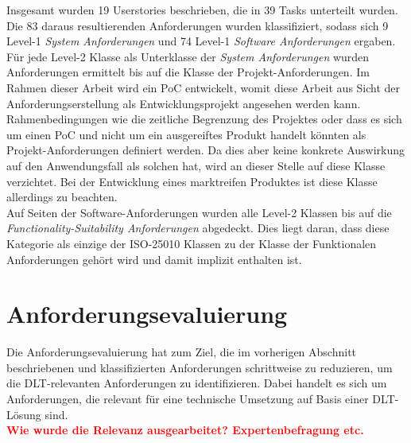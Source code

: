 Insgesamt wurden 19 Userstories beschrieben, die in 39 Tasks unterteilt wurden. Die 83 daraus resultierenden Anforderungen wurden klassifiziert, sodass sich 9 Level-1 \textit{System Anforderungen} und 74 Level-1 \textit{Software Anforderungen} ergaben. Für jede Level-2 Klasse als Unterklasse der \textit{System Anforderungen} wurden Anforderungen ermittelt bis auf die Klasse der Projekt-Anforderungen. Im Rahmen dieser Arbeit wird ein \ac{PoC} entwickelt, womit diese Arbeit aus Sicht der Anforderungserstellung als Entwicklungsprojekt angesehen werden kann. Rahmenbedingungen wie die zeitliche Begrenzung des Projektes oder dass es sich um einen \ac{PoC} und nicht um ein ausgereiftes Produkt handelt könnten als Projekt-Anforderungen definiert werden. Da dies aber keine konkrete Auswirkung auf den Anwendungsfall als solchen hat, wird an dieser Stelle auf diese Klasse verzichtet. Bei der Entwicklung eines marktreifen Produktes ist diese Klasse allerdings zu beachten.\\
Auf Seiten der Software-Anforderungen wurden alle Level-2 Klassen bis auf die \textit{Functionality-Suitability Anforderungen} abgedeckt. Dies liegt daran, dass diese Kategorie als einzige der \ac{ISO}-25010 Klassen zu der Klasse der Funktionalen Anforderungen gehört wird und damit implizit enthalten ist.

%
%
\section{Anforderungsevaluierung}
\label{sec:requirements:evaluation}
Die Anforderungsevaluierung hat zum Ziel, die im vorherigen Abschnitt beschriebenen und klassifizierten Anforderungen schrittweise zu reduzieren, um die \ac{DLT}-relevanten Anforderungen zu identifizieren. Dabei handelt es sich um Anforderungen, die relevant für eine technische Umsetzung auf Basis einer \ac{DLT}-Lösung sind.\\
\textbf{\textcolor{red}{Wie wurde die Relevanz ausgearbeitet? Expertenbefragung etc.}}\\

